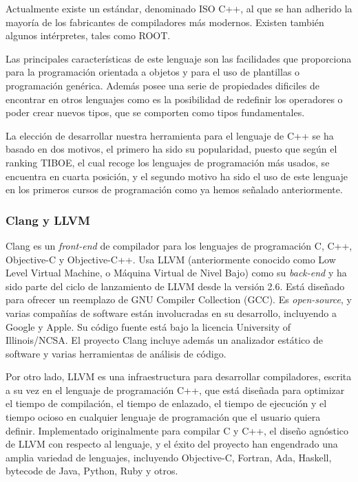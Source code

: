 Actualmente existe un est\'andar, denominado ISO C++, al que se han adherido la mayor\'ia de los fabricantes de compiladores m\'as modernos. Existen tambi\'en algunos int\'erpretes, tales como ROOT.

Las principales caracter\'isticas de este lenguaje son las facilidades que proporciona para la programaci\'on orientada a objetos y para el uso de plantillas o programaci\'on gen\'erica. Adem\'as posee una serie de propiedades dificiles de encontrar en otros lenguajes como es la posibilidad de redefinir los operadores o poder crear nuevos tipos, que se comporten como tipos fundamentales.

La elecci\'on de desarrollar nuestra herramienta para el lenguaje de C++ se ha basado en dos motivos, el primero ha sido su popularidad, puesto que seg\'un el ranking TIBOE, el cual recoge los lenguajes de programaci\'on m\'as usados, se encuentra en cuarta posici\'on, y el segundo motivo ha sido el uso de este lenguaje en los primeros cursos de programaci\'on como ya hemos se\~nalado anteriormente.

\subsubsection*{Clang y LLVM}

Clang es un {\it front-end} de compilador para los lenguajes de programaci\'on C, C++, Objective-C y Objective-C++. Usa LLVM (anteriormente conocido como Low Level Virtual Machine, o M\'aquina Virtual de Nivel Bajo) como su {\it back-end} y ha sido parte del ciclo de lanzamiento de LLVM desde la versi\'on 2.6. Est\'a dise\~nado para ofrecer un reemplazo de GNU Compiler Collection (GCC). Es {\it open-source}, y varias compa\~n\'ias de software est\'an involucradas en su desarrollo, incluyendo a Google y Apple. Su c\'odigo fuente est\'a bajo la licencia University of Illinois/NCSA. El proyecto Clang incluye adem\'as un analizador est\'atico de software y varias herramientas de an\'alisis de c\'odigo.

Por otro lado, LLVM es una infraestructura para desarrollar compiladores, escrita a su vez en el lenguaje de programaci\'on C++, que est\'a dise\~nada para optimizar el tiempo de compilaci\'on, el tiempo de enlazado, el tiempo de ejecuci\'on y el tiempo ocioso en cualquier lenguaje de programaci\'on que el usuario quiera definir. Implementado originalmente para compilar C y C++, el dise\~no agn\'ostico de LLVM con respecto al lenguaje, y el \'exito del proyecto han engendrado una amplia variedad de lenguajes, incluyendo Objective-C, Fortran, Ada, Haskell, bytecode de Java, Python, Ruby y otros.

